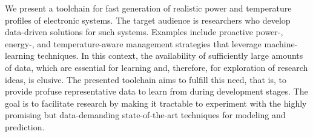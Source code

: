 We present a toolchain for fast generation of realistic power and temperature
profiles of electronic systems. The target audience is researchers who develop
data-driven solutions for such systems. Examples include proactive
\mbox{power-,} \mbox{energy-,} and temperature-aware management strategies that
leverage machine-learning techniques. In this context, the availability of
sufficiently large amounts of data, which are essential for learning and,
therefore, for exploration of research ideas, is elusive. The presented
toolchain aims to fulfill this need, that is, to provide profuse representative
data to learn from during development stages. The goal is to facilitate research
by making it tractable to experiment with the highly promising but
data-demanding state-of-the-art techniques for modeling and prediction.
